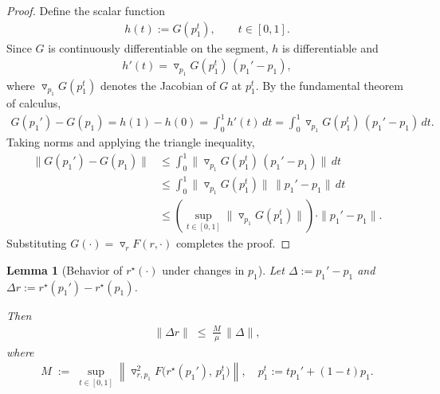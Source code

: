 \documentclass[table]{ai2style/ai2}
\newtheorem{lemma}{Lemma}
\begin{document}
\begin{proof}
Define the scalar function
\begin{align*}
h(t) := G(p_1^t),\qquad t\in[0,1].
\end{align*}
Since $G$ is continuously differentiable on the segment, $h$ is differentiable and
\begin{align*}
h'(t) = \triangledown_{p_1}G(p_1^t)\,(p_1'-p_1),
\end{align*}
where $\triangledown_{p_1}G(p_1^t)$ denotes the Jacobian of $G$ at $p_1^t$.
By the fundamental theorem of calculus,
\begin{align*}
G(p_1')-G(p_1) = h(1)-h(0) = \int_0^1 h'(t)\,dt
= \int_0^1 \triangledown_{p_1}G(p_1^t)\,(p_1'-p_1)\,dt.
\end{align*}
Taking norms and applying the triangle inequality,
\begin{align*}
\|G(p_1')-G(p_1)\|
&\le \int_0^1 \|\triangledown_{p_1}G(p_1^t)\,(p_1'-p_1)\|\,dt \\
&\le \int_0^1 \|\triangledown_{p_1}G(p_1^t)\|\,\|p_1'-p_1\|\,dt \\
&\le \left(\sup_{t\in[0,1]}\|\triangledown_{p_1}G(p_1^t)\|\right)\cdot \|p_1'-p_1\|.
\end{align*}
Substituting $G(\cdot)=\triangledown_r F(r,\cdot)$ completes the proof.
\end{proof}

\begin{lemma}[Behavior of $r^\star(\cdot)$ under changes in $p_1$]\label{lem:stability}
Let $\Delta := p_1'-p_1$ and $\Delta r := r^\star(p_1')-r^\star(p_1)$. 

Then
\begin{align*}
\|\Delta r\| \;\le\; \frac{M}{\mu}\,\|\Delta\|,
\end{align*}
where
\begin{align*}
M \;:=\; \sup_{t\in[0,1]} \left\| \triangledown^2_{r,p_1} F\big(r^\star(p_1'),\, p_1^t\big)\right\|,\quad
p_1^t := t p_1' + (1-t)p_1.
\end{align*}
\end{lemma}
\end{document}
